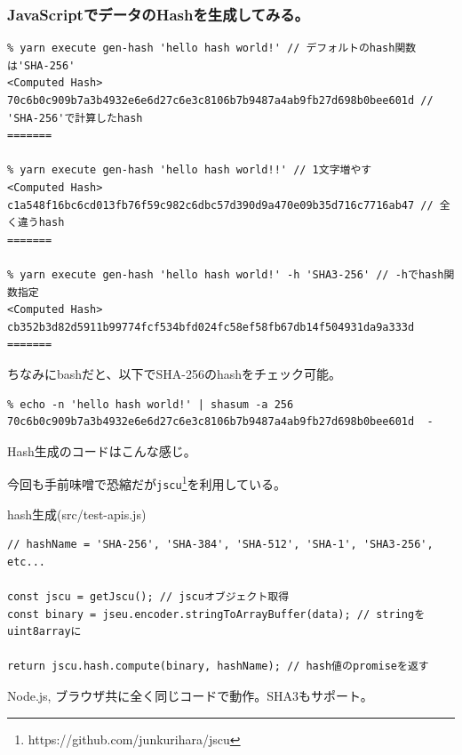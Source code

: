 \documentclass[12pt,dvipdfmx]{beamer}
\begin{document}
\begin{frame}[fragile]
\frametitle{JavaScriptでデータのHashを生成してみる。}
\begin{exampleblock}{}
\scriptsize
\begin{verbatim}
% yarn execute gen-hash 'hello hash world!' // デフォルトのhash関数は'SHA-256'
<Computed Hash>
70c6b0c909b7a3b4932e6e6d27c6e3c8106b7b9487a4ab9fb27d698b0bee601d // 'SHA-256'で計算したhash
=======

% yarn execute gen-hash 'hello hash world!!' // 1文字増やす
<Computed Hash>
c1a548f16bc6cd013fb76f59c982c6dbc57d390d9a470e09b35d716c7716ab47 // 全く違うhash
=======

% yarn execute gen-hash 'hello hash world!' -h 'SHA3-256' // -hでhash関数指定
<Computed Hash>
cb352b3d82d5911b99774fcf534bfd024fc58ef58fb67db14f504931da9a333d
=======
\end{verbatim}
\end{exampleblock}

ちなみにbashだと、以下でSHA-256のhashをチェック可能。

\begin{exampleblock}{}
\scriptsize
\begin{verbatim}
% echo -n 'hello hash world!' | shasum -a 256   
70c6b0c909b7a3b4932e6e6d27c6e3c8106b7b9487a4ab9fb27d698b0bee601d  -
\end{verbatim}
\end{exampleblock}

\end{frame}

\begin{frame}[fragile]
Hash生成のコードはこんな感じ。

今回も手前味噌で恐縮だが\texttt{jscu}\footnote[frame]{https://github.com/junkurihara/jscu}を利用している。

\begin{block}{\small hash生成(src/test-apis.js)}
\scriptsize
\begin{verbatim}
// hashName = 'SHA-256', 'SHA-384', 'SHA-512', 'SHA-1', 'SHA3-256', etc...

const jscu = getJscu(); // jscuオブジェクト取得
const binary = jseu.encoder.stringToArrayBuffer(data); // stringをuint8arrayに

return jscu.hash.compute(binary, hashName); // hash値のpromiseを返す
\end{verbatim}
\end{block}
Node.js, ブラウザ共に全く同じコードで動作。SHA3もサポート。
\end{frame}
\end{document}
